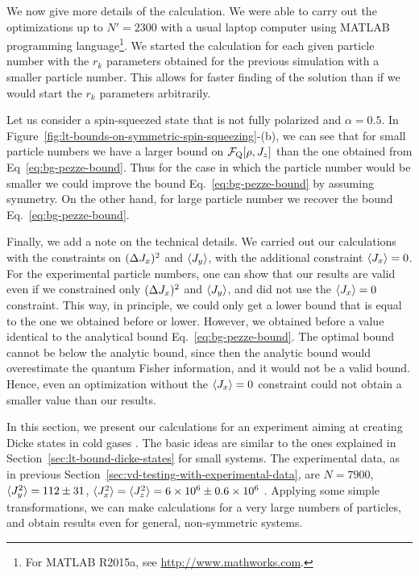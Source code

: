 We now give more details of the calculation. We were able to carry out the optimizations up to $N'=2300$ with a usual laptop computer using MATLAB programming language\footnote{
For MATLAB R2015a, see \url{http://www.mathworks.com}.}.
We started the calculation for each given particle number with the $r_k$ parameters obtained for the previous simulation with a smaller particle number.
This allows for faster finding of the solution than if we would start the $r_k$ parameters arbitrarily.

Let us consider a spin-squeezed state that is not fully polarized and $\alpha=0.5$.
In Figure~\ref{fig:lt-bounds-on-symmetric-spin-squeezing}-(b), we can see that for small particle numbers we have a larger bound on $\mathcal{F}_{\textnormal{Q}}[{\textstyle \rho, J_z}]$ than the one obtained from Eq~\eqref{eq:bg-pezze-bound}.
Thus for the case in which the particle number would be smaller we could improve the bound Eq.~\eqref{eq:bg-pezze-bound} by assuming symmetry.
On the other hand, for large particle number we recover the bound Eq.~\eqref{eq:bg-pezze-bound}.

Finally, we add a note on the technical details.
We carried out our calculations with the constraints on $(\Delta J_x )^2$ and $\langle{J_y}\rangle$, with the additional constraint $\langle{J_x}\rangle=0$.
For the experimental particle numbers, one can show that our results are valid even if we constrained only $(\Delta J_x )^2$ and $\langle{J_y}\rangle$, and did not use the $\langle{J_x}\rangle=0$ constraint.
This way, in principle, we could only get a lower bound that is equal to the one we obtained before or lower.
However, we obtained before a value identical to the analytical bound Eq.~\eqref{eq:bg-pezze-bound}.
The optimal bound cannot be below the analytic bound, since then the analytic bound would overestimate the quantum Fisher information, and it would not be a valid bound.
Hence, even an optimization without the $\langle{J_x}\rangle=0$ constraint could not obtain a smaller value than our results.


In this section, we present our calculations for an experiment aiming at creating Dicke states in cold gases \cite{Luecke2014}.
The basic ideas are similar to the ones explained in Section~\ref{sec:lt-bound-dicke-states} for small systems.
The experimental data, as in previous Section~\ref{sec:vd-testing-with-experimental-data}, are $N=7900$, $\langle{J_y^2}\rangle=112\pm31$, $\langle{J_x^2}\rangle=\langle{J_z^2}\rangle=6\times10^6\pm0.6\times10^6$ \cite{Apellaniz2015}.
Applying some simple transformations, we can make calculations for a very large numbers of particles, and obtain results even for general, non-symmetric systems.

